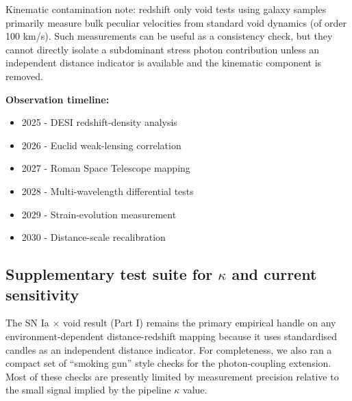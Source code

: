 \documentclass[11pt,a4paper]{article}
\begin{document}
Kinematic contamination note: redshift only void tests using galaxy samples primarily measure bulk peculiar velocities from standard void dynamics (of order 100 km/\allowbreak{}s). Such measurements can be useful as a consistency check, but they cannot directly isolate a subdominant stress photon contribution unless an independent distance indicator is available and the kinematic component is removed.

\begin{mdframed}[linecolor=accent,linewidth=0.5pt,backgroundcolor=callout-bg,leftline=true,rightline=true,topline=true,bottomline=true,innerleftmargin=8pt,innerrightmargin=8pt,innertopmargin=6pt,innerbottommargin=6pt]
\textbf{Observation timeline:}\begin{itemize}
  \item 2025 - DESI redshift-density analysis
  \item 2026 - Euclid weak-lensing correlation
  \item 2027 - Roman Space Telescope mapping
  \item 2028 - Multi-wavelength differential tests
  \item 2029 - Strain-evolution measurement
  \item 2030 - Distance-scale recalibration
\end{itemize}
\end{mdframed}

\subsection{Supplementary test suite for $\kappa$ and current sensitivity}
The SN Ia $\times$ void result (Part I) remains the primary empirical handle on any environment-dependent distance-redshift mapping because it uses
standardised candles as an independent distance indicator. For completeness, we also ran a compact set of ``smoking gun'' style checks for the photon-coupling extension.
Most of these checks are presently limited by measurement precision relative to the small signal implied by the pipeline $\kappa$ value.
\end{document}
